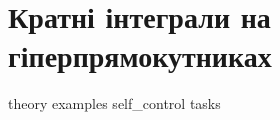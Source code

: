 \part{Кратні інтеграли на гіперпрямокутниках}\label{part:boxes}
{theory}
{examples}
{self_control}
{tasks}
